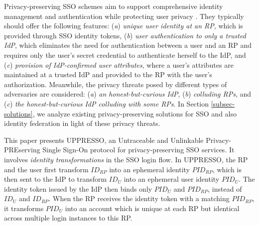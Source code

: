 Privacy-preserving SSO schemes aim to support comprehensive identity management and authentication while protecting user privacy \cite{maler2008venn, NIST2017draft, BrowserID, SPRESSO}.
They typically should offer the following features:
(\emph{a}) \emph{unique user identity at an RP}, which is provided through SSO identity tokens,
(\emph{b}) \emph{user authentication to only a trusted IdP}, which eliminates the need for authentication between a user and an RP and requires only the user's secret credential to authenticate herself to the IdP,
and (\emph{c}) \emph{provision of IdP-confirmed user attributes},  where a user's attributes are maintained at a trusted IdP and provided to the RP with the user's authorization.
 Meanwhile, the privacy threats posed by different types of adversaries are considered:
(\emph{a}) \emph{an honest-but-curious IdP},
(\emph{b}) \emph{colluding RPs},
and (\emph{c}) \emph{the honest-but-curious IdP colluding with some RPs}.
In Section \ref{subsec-solutions}, we analyze existing privacy-preserving solutions for SSO and also identity federation in light of these privacy threats.


This paper presents UPPRESSO, an Untraceable and Unlinkable Privacy-PREserving Single Sign-On protocol for privacy-preserving SSO services. It involves {\em identity transformations} in the SSO login flow.
In UPPRESSO, the RP and the user first transform $ID_{RP}$ into an ephemeral identity $PID_{RP}$, which is then sent to the IdP to transform $ID_U$ into an ephemeral user identity $PID_U$.
The identity token issued by the IdP then binds only $PID_U$ and $PID_{RP}$, instead of $ID_U$ and $ID_{RP}$. When the RP receives the identity token with a matching $PID_{RP}$, it transforms $PID_U$ into an account which is unique at each RP but identical across multiple login instances to this RP.



